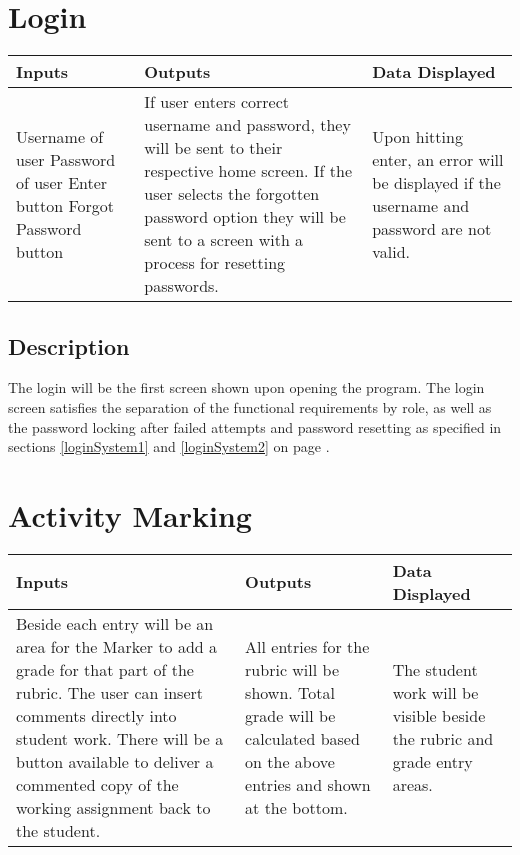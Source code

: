 \documentclass{article}
\begin{document}
\section{Login}
\begin{tabular}{| p{5cm} | p{5cm} | p{5cm} |}
	\hline
	Inputs & Outputs & Data Displayed \\ \hline
	Username of user \newline Password of user \newline Enter button \newline Forgot 
	Password button & If user enters correct username and password, they will be sent 
	to their respective home screen. \newline If the user selects the forgotten password 
	option they will be sent to a screen with a process for resetting passwords. & Upon 
	hitting enter, an error will be displayed if the username and password are not valid.
	\\ \hline
\end{tabular}
\subsection{Description}
The login will be the first screen shown upon opening the program. The login screen 
satisfies the separation of the functional requirements by role, as well as the
password locking after failed attempts and password resetting as specified in
sections \ref{loginSystem1} and \ref{loginSystem2} on page \pageref{loginSystem1}.

\section{Activity Marking}
\begin{tabular}{| p{5cm} | p{5cm} | p{5cm} |}
	\hline
	Inputs & Outputs & Data Displayed \\ \hline
	Beside each entry will be an
	area for the Marker to add a grade for that part of the rubric.
	The user can insert comments directly into student work.
	There will be a button available to deliver a commented copy of the working
assignment back to the student.
	& All entries for the rubric will be shown.
Total grade will be calculated based on the above entries and shown at the
bottom.
	& The student work will be visible beside the rubric and grade entry areas.
	
	\\ \hline
\end{tabular}
\end{document}
